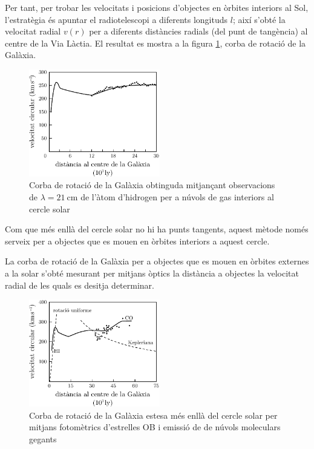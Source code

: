 Per tant, per trobar les velocitats i posicions d'objectes en òrbites interiors al Sol, l'estratègia és apuntar el radiotelescopi a diferents longituds $l$; així s'obté la velocitat radial $v(r)$ per a diferents distàncies radials (del punt de tangència) al centre de la Via Làctia. El resultat es mostra a la figura \ref{fig:gal-corba-rotacio1}, corba de rotació de la Galàxia.
\begin{figure}[H]
	\centering
	\includegraphics[width=0.51\textwidth]{./images/7-gal-corba-rotacio1}
	\caption{Corba de rotació de la Galàxia obtinguda mitjançant observacions de $\lambda = \SI{21}{\cm}$ de l'àtom d'hidrogen per a núvols de gas interiors al cercle solar}
	\label{fig:gal-corba-rotacio1}
\end{figure}

Com que més enllà del cercle solar no hi ha punts tangents, aquest mètode només serveix per a objectes que es mouen en òrbites interiors a aquest cercle.

La corba de rotació de la Galàxia per a objectes que es mouen en òrbites externes a la solar s'obté mesurant per mitjans òptics la distància a objectes la velocitat radial de les quals es desitja determinar.
\begin{figure}[H]
	\centering
	\includegraphics[width=0.51\textwidth]{./images/7-gal-corba-rotacio2}
	\caption{Corba de rotació de la Galàxia estesa més enllà del cercle solar per mitjans fotomètrics d'estrelles OB i emissió de  de núvols moleculars gegants}
	\label{fig:gal-corba-rotacio2}
\end{figure}

